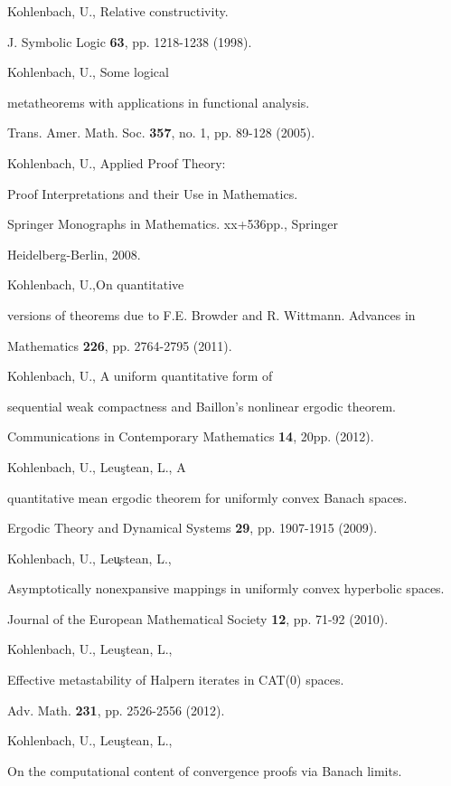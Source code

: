 \documentclass[1p]{elsarticle}
\theoremstyle{plain}
\theoremstyle{definition}
\theoremstyle{remark}
\theoremstyle{definition}
\begin{document}
{\begin{thebibliography}{00}
 Kohlenbach, U., Relative constructivity.

J. Symbolic Logic {\bf 63}, pp. 1218-1238 (1998). 

 Kohlenbach, U., Some logical

metatheorems with applications in functional analysis. 

Trans. Amer. Math. Soc. {\bf 357}, no. 1, pp. 89-128 (2005).

 Kohlenbach, U., Applied Proof Theory: 

Proof Interpretations and their Use in Mathematics. 

Springer Monographs in Mathematics. xx+536pp., Springer 

Heidelberg-Berlin, 2008.

 Kohlenbach, U.,On quantitative 

versions of  theorems due to F.E. Browder and R. Wittmann. Advances in 

Mathematics {\bf 226}, pp. 2764-2795 (2011).   

 Kohlenbach, U., A uniform quantitative form of 

sequential weak compactness and Baillon's nonlinear ergodic theorem. 

Communications in Contemporary Mathematics {\bf 14}, 20pp. (2012). 

 Kohlenbach, U., Leu\c{s}tean, L., A 

quantitative mean ergodic theorem for uniformly convex Banach spaces. 

Ergodic Theory and Dynamical Systems {\bf 29}, pp. 1907-1915 (2009). 

 Kohlenbach, U., Leu\c{}stean, L., 

Asymptotically nonexpansive mappings in uniformly convex hyperbolic spaces. 

Journal of the European Mathematical Society {\bf 12}, pp. 71-92 (2010). 

 Kohlenbach, U., Leu\c{s}tean, L., 

Effective metastability of Halpern iterates in CAT(0) spaces.

Adv. Math. {\bf 231}, pp. 2526-2556 (2012).

 Kohlenbach, U., Leu\c{s}tean, L., 

On the computational content of convergence proofs via Banach limits. 


\end{thebibliography}}
\end{document}
